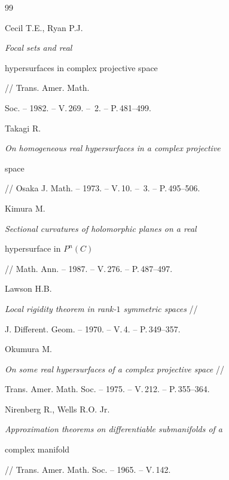 \begin{thebibliography}{99}







Cecil T.E., Ryan P.J.


{\em Focal sets and real


hypersurfaces in complex projective space} // Trans. Amer. Math.


Soc. -- 1982. -- V.\,269. -- \No\,2. -- P.\,481--499.







Takagi R.


{\em  On homogeneous real hypersurfaces in a complex projective


space} // Osaka J. Math. -- 1973. -- V.\,10. -- \No\,3. -- P.\,495--506.







Kimura M.


{\em   Sectional curvatures of holomorphic planes on a real


hypersurface in $P^n(C)$} // Math. Ann. -- 1987. -- V.\,276. -- P.\,487--497.







Lawson H.B.


{\em Local rigidity theorem in rank-$1$ symmetric spaces} //


J. Different. Geom. -- 1970. -- V.\,4. -- P.\,349--357.







Okumura M.


{\em On some real hypersurfaces of a complex projective space} //


Trans. Amer. Math. Soc. -- 1975. -- V.\,212. -- P.\,355--364.







Nirenberg R., Wells R.O. Jr.


{\em  Approximation theorems on differentiable submanifolds of a


complex manifold} // Trans. Amer. Math. Soc. -- 1965. -- V.\,142.



\end{thebibliography}
